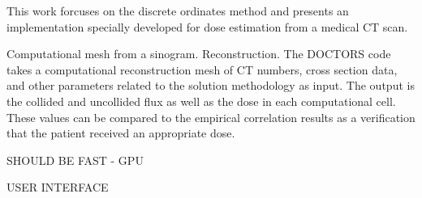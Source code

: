 This work forcuses on the discrete ordinates method and presents an implementation specially developed for dose estimation from a medical CT scan. 

Computational mesh from a sinogram. Reconstruction.
The DOCTORS code takes a computational reconstruction mesh of CT numbers, cross section data, and other parameters related to the solution methodology as input. The output is the collided and uncollided flux as well as the dose in each computational cell. These values can be compared to the empirical correlation results as a verification that the patient received an appropriate dose.

SHOULD BE FAST - GPU

USER INTERFACE

\endinput
